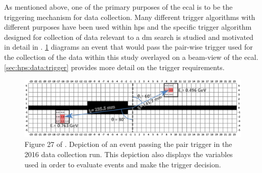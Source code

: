 As mentioned above, one of the primary purposes of the \ac{ecal} is to be the triggering mechanism
for data collection. Many different trigger algorithms with different purposes have been used
within \ac{hps} and the specific trigger algorithm designed for collection of data relevant to a
\ac{dm} search is studied and motivated in detail in \cite{skmccarty-thesis-2020}.
\cref{fig:hps-pair-trigger-depiction} diagrams an event that would pass the pair-wise trigger used
for the collection of the data within this study overlayed on a beam-view of the \ac{ecal}.
\cref{sec:hps:data:trigger} provides more detail on the trigger requirements.

\begin{figure}
  \centering
  \includegraphics[width=\textwidth]{figures/hps/experiment/skmccarty-thesis-fig-27-pair-trigger-depiction.png}
  \caption{
    Figure 27 of \cite{skmccarty-thesis-2020}. Depiction of an event passing the pair trigger
    in the 2016 data collection run. This depiction also displays the variables used in order
    to evaluate events and make the trigger decision.
  }
  \label{fig:hps-pair-trigger-depiction}
\end{figure}
